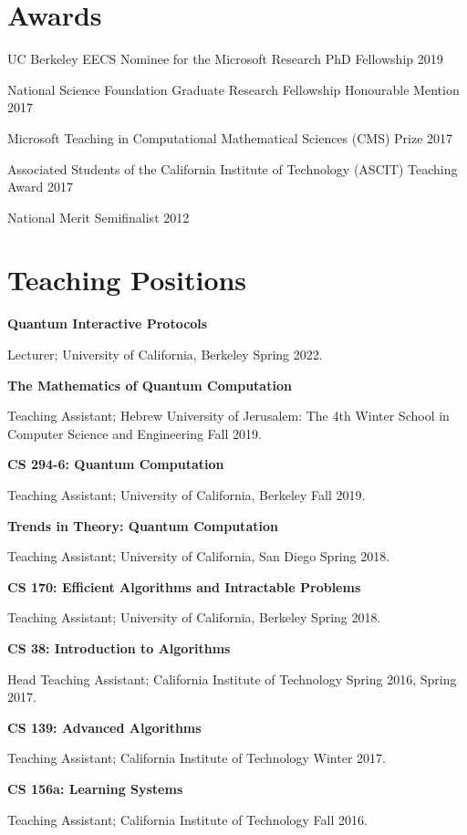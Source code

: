 \documentclass[11pt]{article}
\begin{document}
\section{Awards}
UC Berkeley EECS Nominee for the Microsoft Research PhD Fellowship 2019

National Science Foundation Graduate Research Fellowship Honourable Mention 2017 

Microsoft Teaching in Computational Mathematical Sciences (CMS) Prize 2017

Associated Students of the California Institute of Technology (ASCIT) Teaching Award 2017 

National Merit Semifinalist 2012 \\

\section{Teaching Positions}

\textbf{Quantum Interactive Protocols}

Lecturer; University of California, Berkeley Spring 2022.

\textbf{The Mathematics of Quantum Computation}

Teaching Assistant; Hebrew University of Jerusalem: The 4th Winter School in Computer Science and Engineering Fall 2019.

\textbf{CS 294-6: Quantum Computation}

Teaching Assistant; University of California, Berkeley Fall 2019.

\textbf{Trends in Theory: Quantum Computation}

Teaching Assistant; University of California, San Diego Spring 2018.

\textbf{CS 170: Efficient Algorithms and Intractable Problems}

Teaching Assistant; University of California, Berkeley Spring 2018.

\textbf{CS 38: Introduction to Algorithms}

Head Teaching Assistant; California Institute of Technology Spring 2016, Spring 2017.

\textbf{CS 139: Advanced Algorithms}

Teaching Assistant; California Institute of Technology Winter 2017.

\textbf{CS 156a: Learning Systems}

Teaching Assistant; California Institute of Technology Fall 2016.
\end{document}
